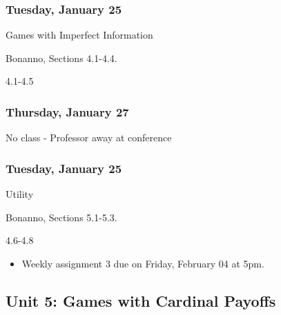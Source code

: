 \documentclass[
]{article}
\providecommand{\tightlist}{%
  \setlength{\itemsep}{0pt}\setlength{\parskip}{0pt}}
\begin{document}
\begin{multicols}{2}

\hypertarget{tuesday-january-25}{%
\subsubsection{Tuesday, January 25}\label{tuesday-january-25}}

\begin{description}
\tightlist
\item[Topic]
Games with Imperfect Information
\item[Reading]
Bonanno, Sections 4.1-4.4.
\item[Video lectures]
4.1-4.5
\end{description}

\hypertarget{thursday-january-27}{%
\subsubsection{Thursday, January 27}\label{thursday-january-27}}

No class - Professor away at conference

\end{multicols}

\hypertarget{tuesday-january-25-1}{%
\subsubsection{Tuesday, January 25}\label{tuesday-january-25-1}}

\begin{description}
\tightlist
\item[Topic]
Utility
\item[Reading]
Bonanno, Sections 5.1-5.3.
\item[Video lectures]
4.6-4.8
\end{description}

\begin{itemize}
\tightlist
\item
  Weekly assignment 3 due on Friday, February 04 at 5pm.
\end{itemize}

\hypertarget{unit-5-games-with-cardinal-payoffs}{%
\subsection{Unit 5: Games with Cardinal
Payoffs}\label{unit-5-games-with-cardinal-payoffs}}
\end{document}
